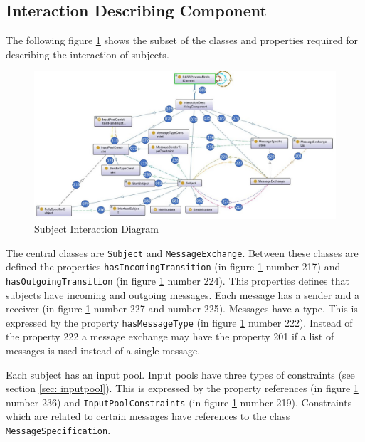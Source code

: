 \subsection{Interaction Describing Component}

The following figure \ref{fig:ontogrsubjectinteraction} shows the subset of the classes and properties required for describing the interaction of subjects. 

\begin{figure}[htbp]
	\centering
	\includegraphics[width=1.0\linewidth]{Figures/Ontology/SubjectInteraction/OntoGrSubjectInteraction}
	\caption[Subject Interaction Diagram]{Subject Interaction Diagram}
	\label{fig:ontogrsubjectinteraction}
\end{figure}

The central classes are \texttt{Subject} and \texttt{MessageExchange}. Between these classes are defined the properties \texttt{hasIncomingTransition} (in figure \ref{fig:ontogrsubjectinteraction} number 217) and \texttt{hasOutgoingTransition} (in figure \ref{fig:ontogrsubjectinteraction} number 224). This properties defines that subjects have incoming and outgoing messages. Each message has a sender and a receiver (in figure \ref{fig:ontogrsubjectinteraction} number 227 and number 225). Messages have a type. This is expressed by the property \texttt{hasMessageType} (in figure \ref{fig:ontogrsubjectinteraction} number 222). Instead of the property 222 a message exchange may have the property 201 if a list of messages is used instead of a single message.

Each subject has an input pool. Input pools have three types of constraints (see section \ref{sec: inputpool}). This is expressed by the property references  (in figure \ref{fig:ontogrsubjectinteraction} number 236) and \texttt{InputPoolConstraints} (in figure \ref{fig:ontogrsubjectinteraction} number 219). Constraints which are related to certain messages have references to the class \texttt{MessageSpecification}.

